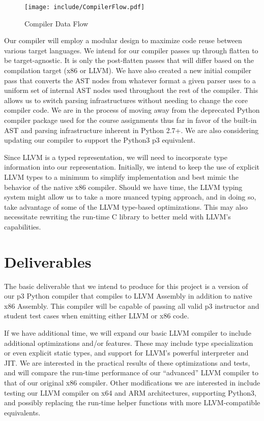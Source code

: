 \documentclass[11pt]{article}
\begin{document}
\begin{figure}[htb]
  \centering
  \texttt{[image: include/CompilerFlow.pdf]}
  \caption{Compiler Data Flow}
  \label{fig:CompilerFlow}
\end{figure}

Our compiler will employ a modular design to maximize code reuse
between various target languages.  We intend for our compiler passes
up through flatten to be target-agnostic. It is only the post-flatten
passes that will differ based on the compilation target (x86 or
LLVM). We have also created a new initial compiler pass that converts
the AST nodes from whatever format a given parser uses to a uniform
set of internal AST nodes used throughout the rest of the
compiler. This allows us to switch parsing infrastructures without
needing to change the core compiler code. We are in the process of
moving away from the deprecated Python compiler package used for the
course assignments thus far in favor of the built-in AST and parsing
infrastructure inherent in Python 2.7+. We are also considering
updating our compiler to support the Python3 p3 equivalent.

Since LLVM is a typed representation, we will need to incorporate type
information into our representation. Initially, we intend to keep the
use of explicit LLVM types to a minimum to simplify implementation and
best mimic the behavior of the native x86 compiler. Should we have
time, the LLVM typing system might allow us to take a more nuanced
typing approach, and in doing so, take advantage of some of the LLVM
type-based optimizations. This may also necessitate rewriting the
run-time C library to better meld with LLVM's capabilities.

\section{Deliverables}

The basic deliverable that we intend to produce for this project is a
version of our p3 Python compiler that compiles to LLVM Assembly in
addition to native x86 Assembly. This compiler will be capable of
passing all valid p3 instructor and student test cases when emitting
either LLVM or x86 code.

If we have additional time, we will expand our basic LLVM compiler to
include additional optimizations and/or features. These may include
type specialization or even explicit static types, and support for
LLVM's powerful interpreter and JIT.  We are interested in the
practical results of these optimizations and tests, and will compare
the run-time performance of our ``advanced'' LLVM compiler to that of
our original x86 compiler. Other modifications we are interested in
include testing our LLVM compiler on x64 and ARM architectures,
supporting Python3, and possibly replacing the run-time helper
functions with more LLVM-compatible equivalents.

\nocite{*}
\printbibliography
\end{document}
